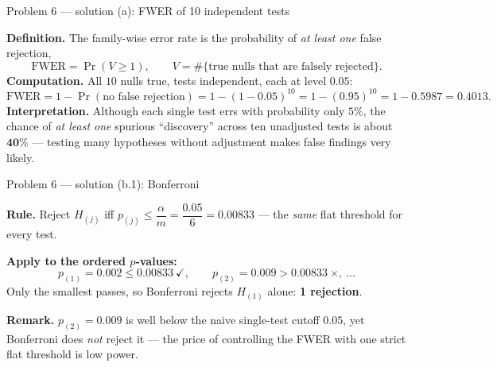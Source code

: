\documentclass[aspectratio=169,11pt]{beamer}
\begin{document}
\begin{frame}{Problem 6 --- solution (a): FWER of 10 independent tests}
  \begin{solutionbox}
    \textbf{Definition.} The family-wise error rate is the probability of \emph{at least one} false
    rejection,
    \[
      \text{FWER}=\Pr(V\ge1),\qquad V=\#\{\text{true nulls that are falsely rejected}\}.
    \]
    \textbf{Computation.} All $10$ nulls true, tests independent, each at level $0.05$:
    \[
      \text{FWER}=1-\Pr(\text{no false rejection})=1-(1-0.05)^{10}=1-(0.95)^{10}=1-0.5987=\mathbf{0.4013}.
    \]
    \textbf{Interpretation.} Although each single test errs with probability only $5\%$, the chance
    of \emph{at least one} spurious ``discovery'' across ten unadjusted tests is about
    $\mathbf{40\%}$ --- testing many hypotheses without adjustment makes false findings very likely.
  \end{solutionbox}
\end{frame}

\begin{frame}{Problem 6 --- solution (b.1): Bonferroni}
  \begin{solutionbox}
    \textbf{Rule.} Reject $H_{(j)}$ iff $p_{(j)}\le\dfrac{\alpha}{m}=\dfrac{0.05}{6}=0.00833$
    --- the \emph{same} flat threshold for every test.
    \medskip

    \textbf{Apply to the ordered $p$-values:}
    \[
      p_{(1)}=0.002\le 0.00833\ \checkmark,\qquad p_{(2)}=0.009>0.00833\ \times,\ \dots
    \]
    Only the smallest passes, so Bonferroni rejects $H_{(1)}$ alone: \textbf{1 rejection}.
    \medskip

    \textbf{Remark.} $p_{(2)}=0.009$ is well below the naive single-test cutoff $0.05$, yet
    Bonferroni does \emph{not} reject it --- the price of controlling the FWER with one strict flat
    threshold is low power.
  \end{solutionbox}
\end{frame}
\end{document}
